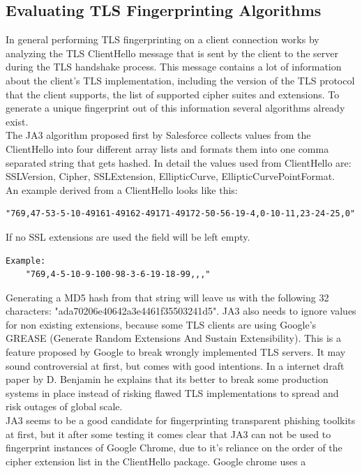 \documentclass[12pt]{scrbook}
\begin{document}
\subsection{Evaluating TLS Fingerprinting Algorithms} In general performing TLS
fingerprinting on a client connection works by analyzing the TLS ClientHello
message that is sent by the client to the server during the TLS handshake
process. This message contains a lot of information about the client's TLS
implementation, including the version of the TLS protocol that the client
supports, the list of supported cipher suites and extensions. To generate a
unique fingerprint out of this information several algorithms already
exist.\\The JA3 algorithm proposed first by Salesforce \cite{ja3Salesforce}
collects values from the ClientHello into four different array lists and formats
them into one comma separated string that gets hashed. In detail the values used
from ClientHello are: SSLVersion, Cipher, SSLExtension, EllipticCurve,
EllipticCurvePointFormat.\\An example derived from a ClientHello looks like
this: \begin{lstlisting}[breaklines=true]
  "769,47-53-5-10-49161-49162-49171-49172-50-56-19-4,0-10-11,23-24-25,0"
  \end{lstlisting} If no SSL extensions are used the field will be left empty.
  \begin{lstlisting}[breaklines=true] Example:
    "769,4-5-10-9-100-98-3-6-19-18-99,,," \end{lstlisting} Generating a MD5 hash
    from that string will leave us with the following 32 characters:
    "ada70206e40642a3e4461f35503241d5". JA3 also needs to ignore values for non
    existing extensions, because some TLS clients are using Google’s GREASE
    (Generate Random Extensions And Sustain Extensibility). This is a feature
    proposed by Google to break wrongly implemented TLS servers. It may sound
    controversial at first, but comes with good intentions. In a internet draft
    paper by D. Benjamin \cite{greaseDraft} he explains that its better to break
    some production systems in place instead of risking flawed TLS
    implementations to spread and risk outages of global scale.\\JA3 seems to be
    a good candidate for fingerprinting transparent phishing toolkits at first,
    but it after some testing it comes clear that JA3 can not be used to
    fingerprint instances of Google Chrome, due to it's reliance on the order of
    the cipher extension list in the ClientHello package. Google chrome uses a
\end{document}

